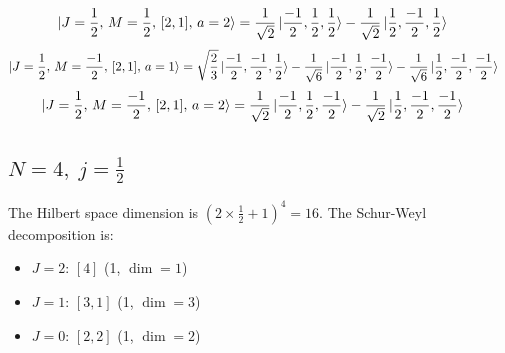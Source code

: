 \documentclass{article}
\begin{document}
\begin{equation*}
\begin{aligned}
\ket{J=\frac{1}{2},\,M=\frac{1}{2},\,[2,1],\,a=2} = \; &\frac{1}{\sqrt{2}} \ket{\frac{-1}{2},\frac{1}{2},\frac{1}{2}} - \frac{1}{\sqrt{2}} \ket{\frac{1}{2},\frac{-1}{2},\frac{1}{2}}
\end{aligned}
\end{equation*}
\begin{equation*}
\begin{aligned}
\ket{J=\frac{1}{2},\,M=\frac{-1}{2},\,[2,1],\,a=1} = \; &\sqrt{\frac{2}{3}} \ket{\frac{-1}{2},\frac{-1}{2},\frac{1}{2}} - \frac{1}{\sqrt{6}} \ket{\frac{-1}{2},\frac{1}{2},\frac{-1}{2}} - \frac{1}{\sqrt{6}} \ket{\frac{1}{2},\frac{-1}{2},\frac{-1}{2}}
\end{aligned}
\end{equation*}
\begin{equation*}
\begin{aligned}
\ket{J=\frac{1}{2},\,M=\frac{-1}{2},\,[2,1],\,a=2} = \; &\frac{1}{\sqrt{2}} \ket{\frac{-1}{2},\frac{1}{2},\frac{-1}{2}} - \frac{1}{\sqrt{2}} \ket{\frac{1}{2},\frac{-1}{2},\frac{-1}{2}}
\end{aligned}
\end{equation*}
\subsection*{$N=4,\; j=\frac{1}{2}$}

The Hilbert space dimension is $(2\times \frac{1}{2} +1)^{4}=16$.
The Schur-Weyl decomposition is:
\begin{itemize}
  \item $J=2$: $[4]$ (1, $\dim = 1$)
  \item $J=1$: $[3,1]$ (1, $\dim = 3$)
  \item $J=0$: $[2,2]$ (1, $\dim = 2$)
\end{itemize}
\end{document}
